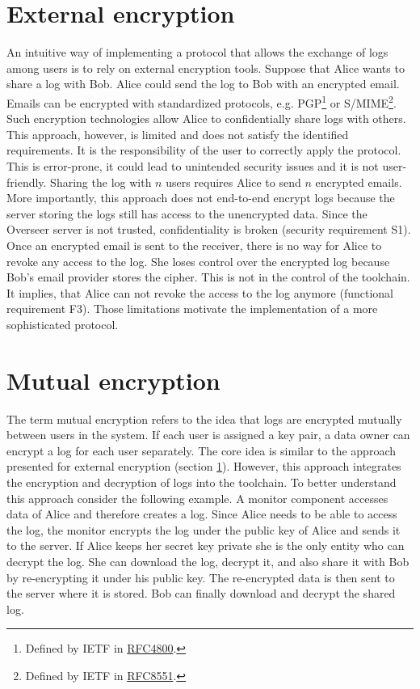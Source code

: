 \documentclass[../main.tex]{subfiles}
\begin{document}
\section{External encryption}
\label{sec:external-encryption}
An intuitive way of implementing a protocol that allows the exchange of logs among users is to rely on external encryption tools.
Suppose that Alice wants to share a log with Bob.
Alice could send the log to Bob with an encrypted email.
Emails can be encrypted with standardized protocols, e.g. PGP\footnote{Defined by IETF in \href{https://www.rfc-editor.org/rfc/rfc4880}{RFC4800}.} or S/MIME\footnote{Defined by IETF in \href{https://www.rfc-editor.org/rfc/rfc8551.html}{RFC8551}.}.
Such encryption technologies allow Alice to confidentially share logs with others.
This approach, however, is limited and does not satisfy the identified requirements.
It is the responsibility of the user to correctly apply the protocol.
This is error-prone, it could lead to unintended security issues and it is not user-friendly.
Sharing the log with $n$ users requires Alice to send $n$ encrypted emails.
More importantly, this approach does not end-to-end encrypt logs because the server storing the logs still has access to the unencrypted data.
Since the Overseer server is not trusted, confidentiality is broken (security requirement S1).
Once an encrypted email is sent to the receiver, there is no way for Alice to revoke any access to the log.
She loses control over the encrypted log because Bob's email provider stores the cipher.
This is not in the control of the toolchain.
It implies, that Alice can not revoke the access to the log anymore (functional requirement F3).
Those limitations motivate the implementation of a more sophisticated protocol.

\section{Mutual encryption}
\label{sec:mutual-encryption}
The term mutual encryption refers to the idea that logs are encrypted mutually between users in the system.
If each user is assigned a key pair, a data owner can encrypt a log for each user separately.
The core idea is similar to the approach presented for external encryption (section \ref{sec:external-encryption}).
However, this approach integrates the encryption and decryption of logs into the toolchain.
To better understand this approach consider the following example.
A monitor component accesses data of Alice and therefore creates a log.
Since Alice needs to be able to access the log, the monitor encrypts the log under the public key of Alice and sends it to the server.
If Alice keeps her secret key private she is the only entity who can decrypt the log.
She can download the log, decrypt it, and also share it with Bob by re-encrypting it under his public key.
The re-encrypted data is then sent to the server where it is stored.
Bob can finally download and decrypt the shared log.
\end{document}
